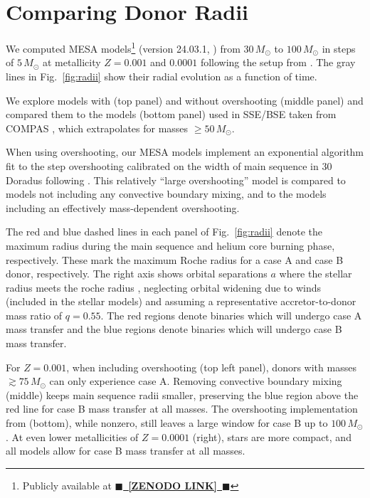 \documentclass[twocolumn]{aastex63}
\DeclareRobustCommand{\Figref}[1]{Fig.~\ref{#1}}
\newcommand{\todo}[1]{{\large $\blacksquare$~\textbf{\color{red}[#1]}}~$\blacksquare$}
\begin{document}
\section{Comparing Donor Radii}

We computed \textsc{MESA} models\footnote{Publicly available at
  \href{LINK}{\todo{ZENODO LINK}}} (version 24.03.1,
\citealt{paxton:11, paxton:13, paxton:15, paxton:18, paxton:19,
  jermyn:23}) from $30 \, M_{\odot}$ to $100 \, M_{\odot}$ in steps of
$5\,M_\odot$ at metallicity $Z=0.001$ and $0.0001$ following the setup
from \cite{renzo:23}. The gray lines in \Figref{fig:radii} show their
radial evolution as a function of time.

We explore models with (top panel) and without overshooting (middle
panel) and compared them to the \cite{pols:98} models (bottom panel)
used in \textsc{SSE/BSE} \citep{hurley:00} taken from \textsc{COMPAS}
\citep{stevenson:17, vignagomez:18, riley:22}, which extrapolates for
masses $\geq50\,M_\odot$.

When using overshooting, our \textsc{MESA} models implement an
exponential algorithm \citep{herwig:00} fit to the step overshooting
calibrated on the width of main sequence in 30 Doradus
\citep{brott:11} following \cite{claret:18}. This relatively ``large
overshooting'' model is compared to models not including any
convective boundary mixing, and to the \cite{pols:98} models including
an effectively mass-dependent overshooting.

The red and blue dashed lines in each panel of \Figref{fig:radii}
denote the maximum radius during the main sequence and helium core
burning phase, respectively. These mark the maximum Roche radius for a
case A and case B donor, respectively. The right axis shows orbital
separations $a$ where the stellar radius meets the roche radius
\citep{eggleton:83}, neglecting orbital widening due to winds
(included in the stellar models) and assuming a representative
accretor-to-donor mass ratio of $q=0.55$. The red regions denote
binaries which will undergo case A mass transfer and the blue regions
denote binaries which will undergo case B mass transfer.

For $Z=0.001$, when including overshooting (top left panel), donors
with masses $ \gtrsim 75 \, M_{\odot}$ can only experience case A.
Removing convective boundary mixing (middle) keeps main sequence radii
smaller, preserving the blue region above the red line for case B mass
transfer at all masses. The overshooting implementation from
\cite{pols:98} (bottom), while nonzero, still leaves a large window
for case B up to $100 \, M_{\odot}$. At even lower metallicities of
$Z=0.0001$ (right), stars are more compact, and all models allow for
case B mass transfer at all masses.
\end{document}
